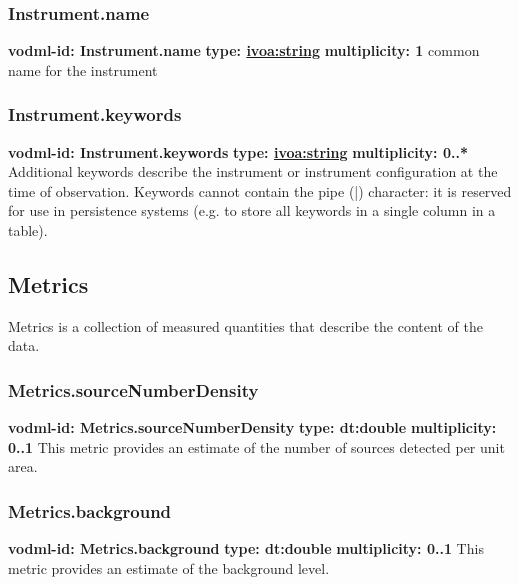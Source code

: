     \subsubsection{Instrument.name}
      \textbf{vodml-id: Instrument.name} \newline
      \textbf{type: \hyperref[sect:ivoa]{ivoa:string}} \newline
      \textbf{multiplicity: 1} \newline
      common name for the instrument

    \subsubsection{Instrument.keywords}
      \textbf{vodml-id: Instrument.keywords} \newline
      \textbf{type: \hyperref[sect:ivoa]{ivoa:string}} \newline
      \textbf{multiplicity: 0..*} \newline
      Additional keywords describe the instrument or instrument configuration at the time of observation. Keywords cannot contain the pipe (|) character: it is reserved for use in persistence systems (e.g. to store all keywords in a single column in a table).

  \subsection{Metrics}
  \label{sect:Metrics}
    Metrics is a collection of measured quantities that describe the content of the data.

    \subsubsection{Metrics.sourceNumberDensity}
      \textbf{vodml-id: Metrics.sourceNumberDensity} \newline
      \textbf{type: dt:double} \newline
      \textbf{multiplicity: 0..1} \newline
      This metric provides an estimate of the number of sources detected per unit area.

    \subsubsection{Metrics.background}
      \textbf{vodml-id: Metrics.background} \newline
      \textbf{type: dt:double} \newline
      \textbf{multiplicity: 0..1} \newline
      This metric provides an estimate of the background level.

